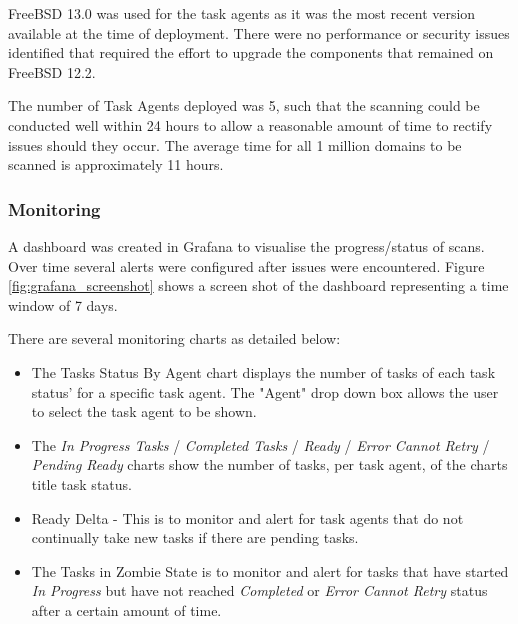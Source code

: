 \documentclass{mscreport}
\begin{document}
\noindent
FreeBSD 13.0 was used for the task agents as it was the most recent version available at the time of deployment. There were no performance or security issues identified that required the effort to upgrade the components that remained on FreeBSD 12.2.

\vspace{0.3cm} \noindent
The number of Task Agents deployed was 5, such that the scanning could be conducted well within 24 hours to allow a reasonable amount of time to rectify issues should they occur. The average time for all 1 million domains to be scanned is approximately 11 hours.


\subsubsection{Monitoring}
\label{section:deployment_monitoring}

A dashboard was created in Grafana to visualise the progress/status of scans. Over time several alerts were configured after issues were encountered. Figure \ref{fig:grafana_screenshot} shows a screen shot of the dashboard representing a time window of 7 days.

\newpage

\vspace{0.3cm} \noindent
There are several monitoring charts as detailed below:
\begin{itemize}
	\setlength\itemsep{0.1em}
    \item The Tasks Status By Agent chart displays the number of tasks of each task status' for a specific task agent. The "Agent" drop down box allows the user to select the task agent to be shown.
    \item The \textit{In Progress Tasks} / \textit{Completed Tasks} / \textit{Ready} / \textit{Error Cannot Retry} / \textit{Pending Ready} charts show the number of tasks, per task agent, of the charts title task status.
    \item Ready Delta - This is to monitor and alert for task agents that do not continually take new tasks if there are pending tasks.
    \item The Tasks in Zombie State is to monitor and alert for tasks that have started \textit{In Progress} but have not reached \textit{Completed} or \textit{Error Cannot Retry} status after a certain amount of time.
\end{itemize}
\end{document}
